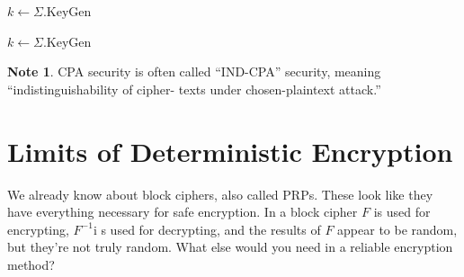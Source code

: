 \documentclass[12pt,openany]{book}
\theoremstyle{definition}
\newtheorem*{note}{Note}
\begin{document}
	\begin{algorithm}[H]
		\DontPrintSemicolon
		\SetAlgoLined
		\BlankLine
		$k \leftarrow \Sigma.\text{KeyGen}$\;
		\BlankLine
		
		\caption{$\mathcal{L}^{\Sigma}_{\mathsf{cpa-L}}$}
	\end{algorithm}
	
	\begin{algorithm}[H]
		\DontPrintSemicolon
		\SetAlgoLined
		\BlankLine
		$k \leftarrow \Sigma.\text{KeyGen}$\;
		\BlankLine
		
		\caption{$\mathcal{L}^{\Sigma}_{\mathsf{cpa-R}}$}
	\end{algorithm}
	\vspace{24pt}
	\begin{note}
		CPA security is often called ``IND-CPA'' security, meaning ``indistinguishability of cipher-
		texts under chosen-plaintext attack.''
	\end{note}
	
	\section{Limits of Deterministic Encryption}
	
	We already know about block ciphers, also called PRPs. These look like they have everything necessary for safe encryption. In a block cipher $F$ is used for encrypting, $F^{-1}$i s used for decrypting, and the results of $F$ appear to be random, but they're not truly random. What else would you need in a reliable encryption method?
	
\end{document}
